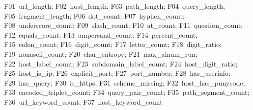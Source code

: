 F01~url\_length; F02~host\_length; F03~path\_length; F04~query\_length; F05~fragment\_length; F06~dot\_count; F07~hyphen\_count; F08~underscore\_count; F09~slash\_count; F10~at\_count; F11~question\_count; F12~equals\_count; F13~ampersand\_count; F14~percent\_count; F15~colon\_count; F16~digit\_count; F17~letter\_count; F18~digit\_ratio; F19~nonascii\_count; F20~char\_entropy; F21~max\_alnum\_run; F22~host\_label\_count; F23~subdomain\_label\_count; F24~host\_digit\_ratio; F25~host\_is\_ip; F26~explicit\_port; F27~port\_number; F28~has\_userinfo; F29~has\_query; F30~is\_https; F31~scheme\_missing; F32~host\_has\_punycode; F33~encoded\_triplet\_count; F34~query\_pair\_count; F35~path\_segment\_count; F36~url\_keyword\_count; F37~host\_keyword\_count
